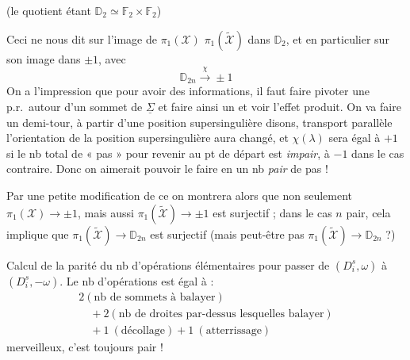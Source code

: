 \documentclass[11pt,a4paper]{article}
\begin{document}
(le quotient étant $\mathbb{D}_2 \simeq \mathbb{F}_2 \times \mathbb{F}_2$)

Ceci ne nous dit  sur l'image de $\pi_1(\mathcal{X})$  $\pi_1(\widetilde{\mathcal{X}})$ dans $\mathbb{D}_{2}$, et en particulier sur son image dans $\pm 1$,   avec
\[
\mathbb{D}_{2n} \xrightarrow{\ \chi\ } \pm 1
\]
On a l'impression que pour avoir des informations, il faut faire pivoter une p.r.\ autour d'un sommet de $\underline{\Sigma}$ et faire ainsi un  et voir l'effet produit. On va faire un demi-tour, à partir d'une position supersingulière disons, \struck{\ill{}} transport parallèle l'orientation de la position supersingulière aura changé, et \struck{\ill{}} $\chi(\lambda)$ sera égal à $+1$ si le nb total de « pas » pour revenir au pt de départ est \emph{impair}, à $-1$ dans le cas contraire. Donc on aimerait pouvoir le faire en un nb \emph{pair} de pas !

Par une petite modification de ce  on montrera alors que non seulement $\pi_1(\mathcal{X}) \to \pm 1$, mais aussi $\pi_1(\widetilde{\mathcal{X}}) \to \pm 1$ est surjectif ;  dans le cas $n$ pair, cela implique que $\pi_1(\widetilde{\mathcal{X}}) \to \mathbb{D}_{2n}$ est surjectif (mais peut-être pas $\pi_1(\widetilde{\mathcal{X}}) \to \mathbb{D}_{2n}$ ?)

Calcul de la parité \struck{\ill{}} du nb d'opérations élémentaires pour passer de $(D_i^{s}, \omega)$ à $(D_i^{s}, -\omega)$. Le nb d'opérations est égal à :
\[
\begin{array}{l}
2(\text{nb de sommets à balayer}) \\
\quad + 2(\text{nb de droites par-dessus lesquelles balayer}) \\
\quad + 1 \ (\text{décollage}) + 1 \ (\text{atterrissage})
\end{array}
\]
merveilleux, c'est toujours pair !
\end{document}
